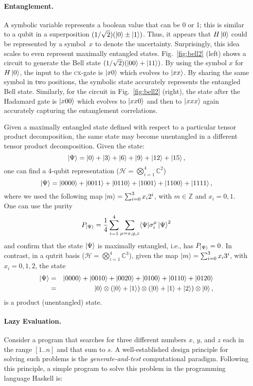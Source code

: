 \documentclass[sigplan]{acmart}
\newcommand{\cx}{\textsc{cx}}
\begin{document}
\paragraph*{Entanglement.}
A symbolic variable represents a boolean value that can be 0 or 1;
this is similar to a qubit in a superposition $(1/\sqrt{2}) (\ket{0}
\pm \ket{1})$. Thus, it appears that $H\ket{0}$ could be represented
by a symbol~$x$ to denote the uncertainty. Surprisingly, this idea
scales to even represent maximally entangled
states. Fig.~\ref{fig:bell2} (left) shows a circuit to generate the Bell
state $(1/\sqrt{2}) (\ket{00} + \ket{11})$. By using the symbol $x$
for $H\ket{0}$, the input to the \cx-gate is $\ket{x0}$ which
evolves to $\ket{xx}$. By sharing the same symbol in two positions,
the symbolic state accurately represents the entangled Bell
state. Similarly, for the circuit in Fig.~\ref{fig:bell2} (right), the
state after the Hadamard gate is $\ket{x00}$ which evolves to
$\ket{xx0}$ and then to $\ket{xxx}$ again accurately capturing the
entanglement correlations.

Given a maximally entangled state defined with respect to a particular
tensor product decomposition, the same state may become unentangled in
a different tensor product decomposition. Given the state:
\[
 \ket{\Psi} =\ket{0}+\ket{3}+\ket{6}+\ket{9}+\ket{12}+\ket{15},
\]
one can find a 4-qubit representation (${\mathcal H}=\bigotimes_{i=1}^4
\mathbb{C}^2$)
\[
 \ket{\Psi} = \ket{0000}+\ket{0011}+\ket{0110} 
  + \ket{1001}+\ket{1100}+\ket{1111},
\]
where we used the following map $\ket{m}=\sum_{i=0}^3 x_i 2^i$, with
$m \in \mathbb{Z}$ and $x_i=0,1$.  One can use the purity~\cite{GE2004}
\[
 P_{\ket{\Psi} }=\frac{1}{4}\sum_{i=1}^4\sum_{\mu=x,y,z}\langle \Psi |
 \sigma^\mu_i \ket{\Psi}^2
\]
and confirm that the state $\ket{\Psi}$ is maximally entangled, i.e.,
has $P_{\ket{\Psi}} =0$. In contrast, in a qutrit basis (${\mathcal
  H}=\bigotimes_{i=1}^4 \mathbb{C}^3$), given the map
$\ket{m}=\sum_{i=0}^3 x_i 3^i$, with $x_i=0,1,2$, the state
\begin{eqnarray}
 \ket{\Psi} &=&\ket{0000}+\ket{0010}+\ket{0020} 
  + \ket{0100}+\ket{0110}+\ket{0120} \nonumber \\
 &=&\ket{0}\otimes(\ket{0}+\ket{1})\otimes(\ket{0}+\ket{1}+\ket{2})\otimes\ket{0}, \nonumber
\end{eqnarray}
is a product (unentangled) state. 

\paragraph*{Lazy Evaluation.}
Consider a program that searches for three different numbers $x$, $y$,
and $z$ each in the range $[1..n]$ and that sum to $s$. A
well-established design principle for solving such problems is the
\emph{generate-and-test} computational paradigm. Following this
principle, a simple program to solve this problem in the programming
language Haskell is:
\end{document}
